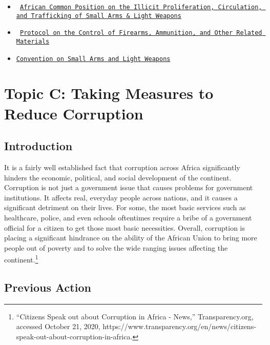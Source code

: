\documentclass[10pt, letterpaper]{article}
\begin{document}
\begin{itemize}
\item
  \texttt{
  \href{https://www.un.org/en/africa/osaa/pdf/au/cap_smallarms_2000.pdf}{African Common Position on the Illicit Proliferation, Circulation, and
  Trafficking of Small Arms \& Light Weapons}}
\item
 \texttt{
  \href{http://www.poa-iss.org/RegionalOrganizations/SADC/Instruments/SADC\%20Protocol.pdf}{Protocol on the Control of Firearms, Ammunition, and Other Related
  Materials}}
 \item
   
  \texttt{\href{https://www.un.org/disarmament/convarms/salw/}{Convention on Small Arms and Light Weapons}}
\end{itemize}

\newpage
\section{Topic C: Taking Measures to Reduce Corruption}

\subsection{Introduction}

It is a fairly well established fact that corruption across Africa
significantly hinders the economic, political, and social development of
the continent. Corruption is not just a government issue that causes
problems for government institutions. It affects real, everyday people
across nations, and it causes a significant detriment on their lives.
For some, the most basic services such as healthcare, police, and even
schools oftentimes require a bribe of a government official for a
citizen to get those most basic necessities. Overall, corruption is
placing a significant hindrance on the ability of the African Union to
bring more people out of poverty and to solve the wide ranging issues
affecting the continent.\footnote{``Citizens Speak out about Corruption
  in Africa - News,'' Transparency.org, accessed October 21, 2020,
  https://www.transparency.org/en/news/citizens-speak-out-about-corruption-in-africa.} \\

\subsection{Previous Action}
\end{document}
